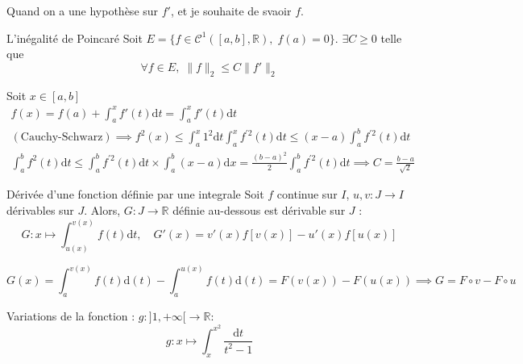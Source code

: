 \begin{note}{}{}
  Quand on a une hypothèse sur $f'$, et je souhaite de svaoir $f$.
\end{note}


\begin{Example}{L'inégalité de Poincaré}{}
  Soit $E = \{ f \in \mathcal{C} ^{1}([a,b], \mathbb{R}), \; f(a) = 0\}$. $\exists C \ge 0$ telle que 
  \begin{equation}
    \forall f \in E, \; \| f \| _{2} \le C \| f' \|_2
  \end{equation}

\end{Example}

\begin{myproof}{}{} Soit $x \in [a,b]$
\begin{gather}
  f(x) = f(a) + \int_{a}^{x} f'(t) \mathrm{d} t = \int_{a}^{x} f'(t) \mathrm{d}t \\ 
  (\text{Cauchy-Schwarz})\implies f ^{2}(x) \le \int_{a}^{x} 1 ^{2} \mathrm{d} t \int_{a}^{x} f^{'2}(t) \mathrm{d} t \le (x-a) \int_{a}^{b} f ^{'2}(t) \mathrm{d} t \\ 
  \int_{a}^{b} f ^{2}(t)  \mathrm{d} t \le \int_{a}^{b}f ^{'2}(t) \mathrm{d}t \times \int_{a}^{b}(x-a) \mathrm{d}x  = \frac{(b-a) ^{2}}{2}  \int_{a}^{b} f ^{'2}(t) \mathrm{d} t \implies C = \frac{b-a}{\sqrt{2}} 
\end{gather} 
\end{myproof}

\begin{Theorem}{Dérivée d'une fonction définie par une integrale}{}
Soit $f$ continue sur $I$, $u, v : J \to I$ dérivables sur $J$. Alors, $G : J \to \mathbb{R}$ définie au-dessous est dérivable sur $J$ :
\begin{equation}
  G : x \mapsto \int_{u(x)}^{v(x)} f(t) \mathrm{d} t, \quad G'(x) = v'(x) f[v(x)] - u'(x) f[u(x)]
\end{equation}



\end{Theorem}

\begin{myproof}{}{}
\begin{equation}
  G(x) = \int_{a}^{v(x)} f(t) \mathrm{d}(t) - \int_{a}^{u(x)} f(t) \mathrm{d}(t) = F(v(x)) - F(u(x)) \implies G = F \circ v - F \circ u
\end{equation}
\end{myproof}

\begin{Example}{}{}
  Variations de la fonction : $g : ]1, + \infty[ \to \mathbb{R}$:
\begin{equation}
  g : x \mapsto \int_{x}^{x ^{2}} \frac{\mathrm{d}t}{t ^{2}-1} 
\end{equation}
\end{Example}

